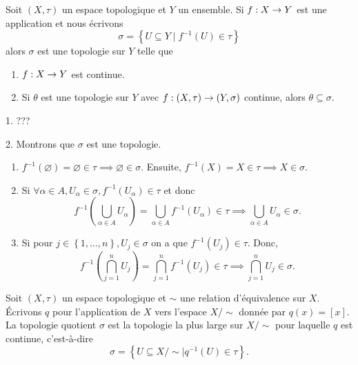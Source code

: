 \documentclass[french]{article}
\begin{document}
\begin{lemme}
  Soit $(X, \tau)$ un espace topologique et $Y$ un ensemble. Si $f: X \rightarrow Y$ est une application et nous écrivons
  $$\sigma = \left\{ U \subseteq Y \mid f^{-1}(U) \in \tau \right\}$$ 
  alors $\sigma$ est une topologie sur $Y$ telle que
  \begin{enumerate}
    \item $f: X \rightarrow Y$ est continue.
    \item Si $\theta$ est une topologie sur $Y$ avec $f: (X, \tau) \rightarrow (Y, \sigma)$ continue, alors $\theta \subseteq \sigma$.
  \end{enumerate}

  \tcblower
  \begin{preuve}
    1. ??? %
    \par 2. Montrons que $\sigma$ est une topologie.
    \begin{enumerate}
      \item $f^{-1}(\varnothing) = \varnothing \in \tau \implies \varnothing \in \sigma$. Ensuite, $f^{-1}(X) = X \in \tau \implies X \in \sigma$.
      \item Si $\forall \alpha \in A, U_\alpha \in \sigma, f^{-1}(U_\alpha) \in \tau$ et donc
        $$f^{-1}\left(\bigcup_{\alpha \in A} U_\alpha \right) = \bigcup_{\alpha \in A} f^{-1}\left( U_\alpha \right) \in \tau \implies \bigcup_{\alpha \in A} U_\alpha \in \sigma.$$ 
      \item Si pour $j \in \left\{ 1, \dots, n \right\}, U_j \in \sigma$ on a que $f^{-1}(U_j) \in \tau$. Donc,
        $$f^{-1}\left( \bigcap_{j=1}^nU_j \right) = \bigcap_{j=1}^n f^{-1}(U_j) \in \tau \implies \bigcap_{j=1}^n U_j \in \sigma.$$
    \end{enumerate}
  \end{preuve}
\end{lemme}

\begin{definition}\label{def:qutop}
  Soit $(X, \tau)$ un espace topologique et $\sim$ une relation d'équivalence sur $X$. Écrivons  $q$ pour l'application de $X$ vers l'espace $X/\sim$ donnée par $q(x) = [x]$. La topologie quotient $\sigma$ est la topologie la plus large sur $X/\sim$ pour laquelle $q$ est continue, c'est-à-dire
  $$\sigma = \left\{ U \subseteq X/\sim \mid q^{-1}(U) \in \tau \right\}.$$
\end{definition}
\end{document}
